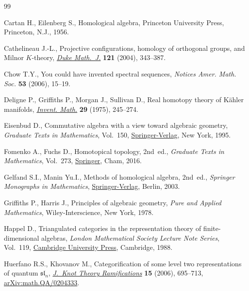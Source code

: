 \documentclass[10pt,a4paper]{amsart}
\theoremstyle{definition}
\numberwithin{equation}{section}
\begin{document}

\begin{thebibliography}{99}
\footnotesize\itemsep=0pt

Cartan H., Eilenberg S., Homological algebra, Princeton University Press,
 Princeton, N.J., 1956.

Cathelineau J.-L., Projective configurations, homology of orthogonal groups, and
 {M}ilnor {$K$}-theory, \href{https://doi.org/10.1215/S0012-7094-04-12125-6}{\textit{Duke Math.~J.}} \textbf{121} (2004), 343--387.

Chow T.Y., You could have invented spectral sequences, \textit{Notices Amer.
 Math. Soc.} \textbf{53} (2006), 15--19.

Deligne P., Griffiths P., Morgan J., Sullivan D., Real homotopy theory of
 {K}\"{a}hler manifolds, \href{https://doi.org/10.1007/BF01389853}{\textit{Invent. Math.}} \textbf{29} (1975), 245--274.

Eisenbud D., Commutative algebra with a view toward algebraic geometry,
 \textit{Graduate Texts in Mathematics}, Vol.~150, \href{https://doi.org/10.1007/978-1-4612-5350-1}{Springer-Verlag}, New York,
 1995.

Fomenko A., Fuchs D., Homotopical topology, 2nd~ed., \textit{Graduate Texts in
 Mathematics}, Vol.~273, \href{https://doi.org/10.1007/978-3-319-23488-5}{Springer}, Cham, 2016.

Gelfand S.I., Manin Yu.I., Methods of homological algebra, 2nd~ed., \textit{Springer
 Monographs in Mathematics}, \href{https://doi.org/10.1007/978-3-662-12492-5}{Springer-Verlag}, Berlin, 2003.

Griffiths P., Harris J., Principles of algebraic geometry, \textit{Pure and Applied Mathematics}, Wiley-Interscience, New York, 1978.

Happel D., Triangulated categories in the representation theory of
 finite-dimensional algebras, \textit{London Ma\-the\-matical Society Lecture Note
 Series}, Vol.~119, \href{https://doi.org/10.1017/CBO9780511629228}{Cambridge University Press}, Cambridge, 1988.

Huerfano R.S., Khovanov M., Categorification of some level two representations
 of quantum {$\mathfrak{sl}_n$}, \href{https://doi.org/10.1142/S0218216506004713}{\textit{J.~Knot Theory Ramifications}} \textbf{15} (2006), 695--713, \href{https://arxiv.org/abs/math.QA/0204333}{arXiv:math.QA/0204333}.


\end{thebibliography}
\end{document}
